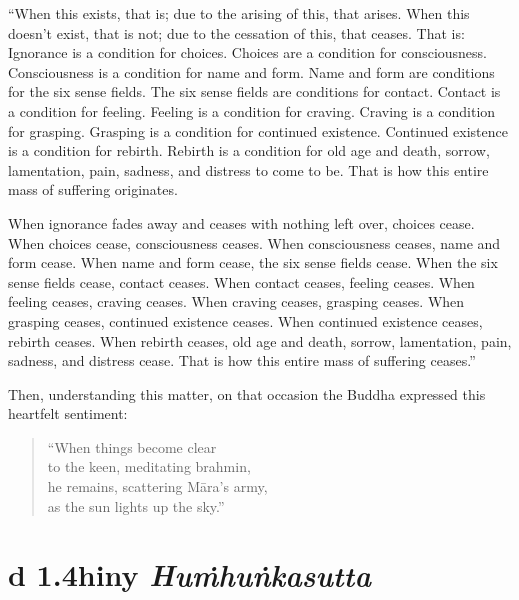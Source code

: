\documentclass[12pt,openany]{book}%
\newcommand*{\suttatitleacronym}[1]{\smaller[2]{#1}\vspace*{.3em}}
\newcommand*{\suttatitletranslation}[1]{\linebreak{#1}}
\newcommand*{\suttatitleroot}[1]{\linebreak\smaller[2]\itshape{#1}}
\newcommand*{\tocacronym}[1]{\hspace*{-3.3em}{#1}\quad}
\newcommand*{\toctranslation}[1]{#1}
\newcommand*{\tocroot}[1]{(\textit{#1})}
\begin{document}
“When this exists, that is; due to the arising of this, that arises. When this doesn’t exist, that is not; due to the cessation of this, that ceases. That is: Ignorance is a condition for choices. Choices are a condition for consciousness. Consciousness is a condition for name and form. Name and form are conditions for the six sense fields. The six sense fields are conditions for contact. Contact is a condition for feeling. Feeling is a condition for craving. Craving is a condition for grasping. Grasping is a condition for continued existence. Continued existence is a condition for rebirth. Rebirth is a condition for old age and death, sorrow, lamentation, pain, sadness, and distress to come to be. That is how this entire mass of suffering originates. 

When ignorance fades away and ceases with nothing left over, choices cease. When choices cease, consciousness ceases. When consciousness ceases, name and form cease. When name and form cease, the six sense fields cease. When the six sense fields cease, contact ceases. When contact ceases, feeling ceases. When feeling ceases, craving ceases. When craving ceases, grasping ceases. When grasping ceases, continued existence ceases. When continued existence ceases, rebirth ceases. When rebirth ceases, old age and death, sorrow, lamentation, pain, sadness, and distress cease. That is how this entire mass of suffering ceases.” 

Then, understanding this matter, on that occasion the Buddha expressed this heartfelt sentiment: 

\begin{verse}%
“When things become clear \\
to the keen, meditating brahmin, \\
he remains, scattering \textsanskrit{Māra}’s army, \\
as the sun lights up the sky.” 

%
\end{verse}

%
\section*{{\suttatitleacronym Ud 1.4}{\suttatitletranslation Whiny }{\suttatitleroot Huṁhuṅkasutta}}
\addcontentsline{toc}{section}{\tocacronym{Ud 1.4} \toctranslation{Whiny } \tocroot{Huṁhuṅkasutta}}
\end{document}
